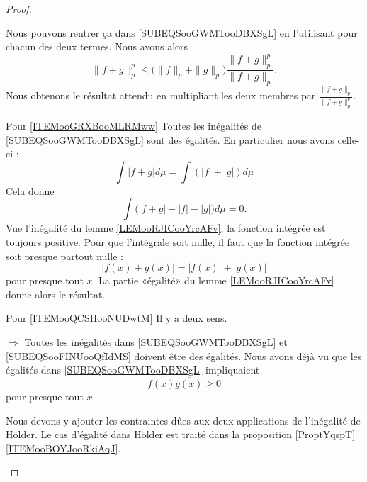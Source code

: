 \begin{proof}
\begin{subproof}
            Nous pouvons rentrer ça dans \eqref{SUBEQSooGWMTooDBXSgL} en l'utilisant pour chacun des deux termes. Nous avons alors
            \begin{equation}
                \| f+g \|_p^p\leq \big( \| f \|_p+\| g \|_p \big)\frac{ \| f+g \|_p^p }{ \| f+g \|_p }.
            \end{equation}
            Nous obtenons le résultat attendu en multipliant les deux membres par \( \frac{ \| f+g \|_p }{ \| f+g \|_p^p }\).
        \item[Pour \ref{ITEMooGRXBooMLRMww}]
            Toutes les inégalités de \eqref{SUBEQSooGWMTooDBXSgL} sont des égalités. En particulier nous avons celle-ci :
            \begin{equation}
                \int | f+g |d\mu=\int(| f |+| g |)d\mu
            \end{equation}
            Cela donne
            \begin{equation}
                \int\big( | f+g |-| f |-|g| \big)d\mu=0.
            \end{equation}
            Vue l'inégalité du lemme \ref{LEMooRJICooYrcAFv}, la fonction intégrée est toujours positive. Pour que l'intégrale soit nulle, il faut que la fonction intégrée soit presque partout nulle : 
            \begin{equation}
                | f(x)+g(x) |=| f(x) |+| g(x) |
            \end{equation}
            pour presque tout \( x\). La partie «égalité» du lemme \ref{LEMooRJICooYrcAFv} donne alors le résultat.
        \item[Pour \ref{ITEMooQCSHooNUDwtM}]
            Il y a deux sens.
            \begin{subproof}
            \item[$ \Rightarrow$]
                Toutes les inégalités dans \eqref{SUBEQSooGWMTooDBXSgL} et \eqref{SUBEQSooFINUooQfIdMS} doivent être des égalités. Nous avons déjà vu que les égalités dans \eqref{SUBEQSooGWMTooDBXSgL} impliquaient
                \begin{equation}
                    f(x)\overline{ g(x) }\geq 0
                \end{equation}
                pour presque tout \( x\).

                Nous devons y ajouter les contraintes dûes aux deux applications de l'inégalité de Hölder. Le cas d'égalité dans Hölder est traité dans la proposition \ref{ProptYqspT}\ref{ITEMooBOYJooRkiAqJ}.


\end{subproof}
\end{subproof}
\end{proof}
